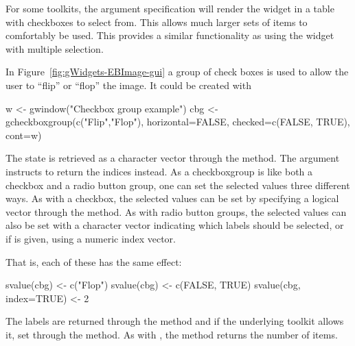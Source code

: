 For some toolkits, the argument specification 
will render the widget in a table with checkboxes to select from. This
allows much larger sets of items to comfortably be used. This provides
a similar functionality as using the  widget with multiple selection.


In Figure~\ref{fig:gWidgets-EBImage-gui} a group of check boxes is
used to allow the user to ``flip'' or ``flop'' the image. It could be
created with

\begin{Schunk}
\begin{Sinput}
 w <- gwindow("Checkbox group example")
 cbg <- gcheckboxgroup(c("Flip","Flop"), horizontal=FALSE, 
                       checked=c(FALSE, TRUE), cont=w)
\end{Sinput}
\end{Schunk}
%


The state is retrieved as a character vector through the
 method. The  argument
instructs  to return the indices instead. As a
checkboxgroup is like both a checkbox and a radio button group, one
can set the selected values three different ways. As with a checkbox, 
the selected values can be set by specifying a logical vector through the
 method. As with radio button groups,
the selected values can also be set with a character vector indicating
which labels should be selected, or if  is given,
using a numeric index vector.


That is, each of these has the same effect:
\begin{Schunk}
\begin{Sinput}
 svalue(cbg) <- c("Flop")
 svalue(cbg) <- c(FALSE, TRUE)
 svalue(cbg, index=TRUE) <- 2
\end{Sinput}
\end{Schunk}

The labels are returned through the \method{[}{gcheckboxgroup} method
and if the underlying toolkit allows it, set through the
\method{[\ASSIGN}{gcheckboxgroup} method. As with ,
the  method returns the number of items.



